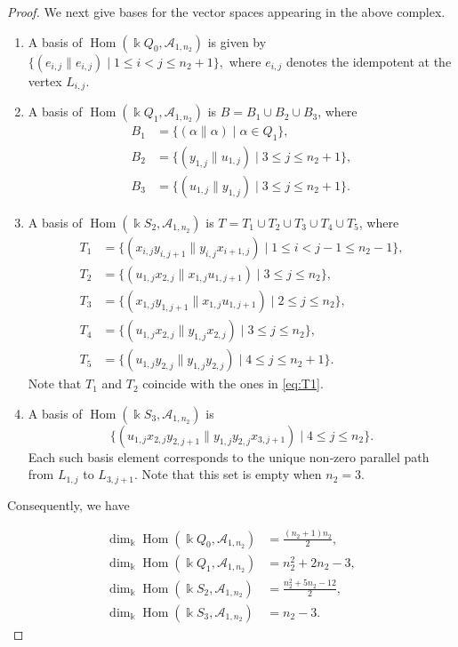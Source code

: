 \documentclass[a4paper, reqno, 11pt]{amsart}
\theoremstyle{definition}
\begin{document}
\begin{proof}
	We next give bases for the vector spaces appearing in the above complex.
	\begin{enumerate}[
		label=(\alph*),
		leftmargin=*,
		itemindent=0pt,
		labelindent=0pt,
		labelsep=0.5em
		]
		\item A basis of $\operatorname{Hom}(\Bbbk Q_0,  \mathcal{A}_{1, n_2})$ is given by
		\(
		\{(e_{i,j} \parallel e_{i,j}) \mid 1 \leq i < j \leq n_2+1\},
		\)
		where $e_{i,j}$ denotes the idempotent at the vertex $L_{i,j}$. 
		
		\item A basis of $\operatorname{Hom}(\Bbbk Q_1,  \mathcal{A}_{1, n_2})$ is $B = B_1 \cup B_2 \cup B_3$, where
		\begin{align*}
			B_1 &= \{(\alpha \parallel \alpha) \mid \alpha \in Q_1\},\\
			B_2 &= \{(y_{1,j} \parallel u_{1,j}) \mid 3 \le j \le n_2+1\},\\
			B_3 &= \{(u_{1,j} \parallel y_{1,j}) \mid 3 \le j \le n_2+1\}.
		\end{align*}
		
		\item A basis of $\operatorname{Hom}(\Bbbk S_2,  \mathcal{A}_{1, n_2})$ is $T = T_1 \cup T_2 \cup T_3 \cup T_4 \cup T_5$, where
		\allowdisplaybreaks
		\begin{align*}
			T_1 &= \{(x_{i,j}y_{i,j+1} \parallel y_{i,j}x_{i+1,j}) \mid 1\leq i<j-1 \leq n_2-1\},\\
			T_2 &= \{(u_{1,j}x_{2,j} \parallel x_{1,j}u_{1,j+1}) \mid 3 \le j \le n_2\},\\
			T_3 &= \{(x_{1,j}y_{1,j+1} \parallel x_{1,j}u_{1,j+1}) \mid 2 \le j \le n_2\},\\
			T_4 &= \{(u_{1,j}x_{2,j} \parallel y_{1,j}x_{2,j}) \mid 3 \le j \le n_2\},\\
			T_5 &= \{(u_{1,j}y_{2,j} \parallel y_{1,j}y_{2,j}) \mid 4 \le j \le n_2+1\}.
		\end{align*}
		Note that $T_1$ and $T_2$ coincide with the ones in \eqref{eq:T1}.
		\item A basis of $\operatorname{Hom}(\Bbbk S_3,  \mathcal{A}_{1, n_2})$ is
		\[
		\{(u_{1,j}x_{2,j}y_{2,j+1} \parallel y_{1,j}y_{2,j}x_{3,j+1}) \mid 4 \le j \le n_2\}.
		\]
		Each such basis element corresponds to the unique non‑zero parallel path from $L_{1,j}$ to $L_{3,j+1}$. Note that this set is empty when $n_2=3$.
	\end{enumerate}
	Consequently, we have
	
	\allowdisplaybreaks
	\begin{align*}
		\dim_{\Bbbk} \operatorname{Hom}(\Bbbk Q_0,  \mathcal{A}_{1, n_2}) &= \frac{(n_2+1)n_2}{2},\\
		\dim_{\Bbbk} \operatorname{Hom}(\Bbbk Q_1,  \mathcal{A}_{1, n_2}) &= n_2^2+2n_2-3,\\
		\dim_{\Bbbk} \operatorname{Hom}(\Bbbk S_2,  \mathcal{A}_{1, n_2})  &= \frac{n_2^2 + 5n_2 - 12}{2},\\
		\dim_{\Bbbk} \operatorname{Hom}(\Bbbk S_3, \mathcal{A}_{1,n_2}) &= n_2-3.
	\end{align*}
	

\end{proof}
\end{document}
